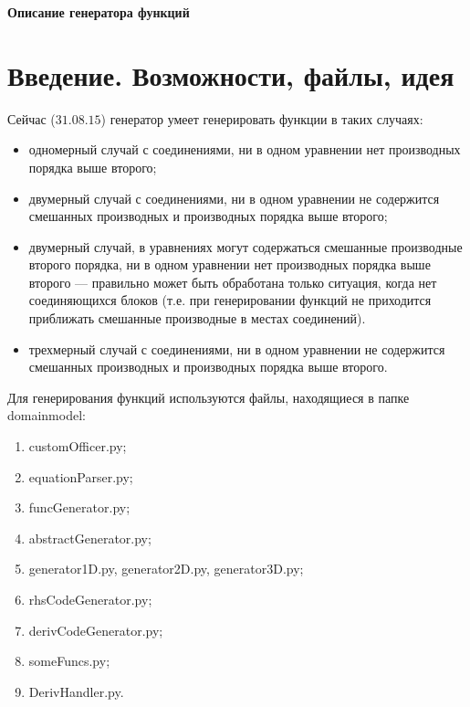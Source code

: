 \documentclass[a4paper]{article}
\begin{document}
\begin{center}
{\Huge \bf Описание генератора функций}
\end{center}

\tableofcontents
\newpage

\large
\section*{\LARGE Введение. Возможности, файлы, идея}
Сейчас ($31.08.15$)  генератор умеет генерировать функции в таких случаях:
\begin{itemize}
\item одномерный случай с соединениями, ни в одном уравнении нет про\-из\-вод\-ных порядка выше второго;
\item двумерный случай с соединениями, ни в одном уравнении не со\-дер\-жит\-ся сме\-шан\-ных производных и производных порядка выше второго;
\item двумерный случай, в уравнениях могут содержаться смешанные про\-из\-вод\-ные второго порядка, ни в одном уравнении нет производных порядка выше второго --- правильно может быть обработана только ситуация, когда нет соединяющихся блоков (т.е. при генерировании функций не приходится приближать смешанные производные в мес\-тах соединений).
\item трехмерный случай с соединениями,  ни в одном уравнении не со\-дер\-жит\-ся сме\-шан\-ных производных и производных порядка выше второго.
\end{itemize}

Для генерирования функций используются файлы, находящиеся в пап\-ке domainmodel:
\begin{enumerate}
\item customOfficer.py; \label{i1}
\item equationParser.py; \label{i2}
\item funcGenerator.py; \label{i3}
\item abstractGenerator.py; \label{i4}
\item generator1D.py, generator2D.py, generator3D.py; \label{i5}
\item  rhsCodeGenerator.py; \label{i6}
\item derivCodeGenerator.py; \label{i7}
\item someFuncs.py; \label{i8}
\item DerivHandler.py. \label{i9}
\end{enumerate}
\end{document}
